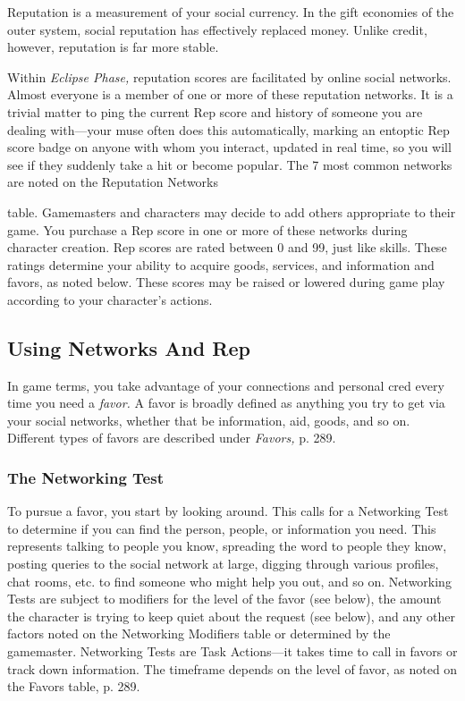 Reputation is a measurement of your social currency. In the gift economies of the outer system, social reputation has effectively replaced money. Unlike credit, however, reputation is far more stable. 

Within \textit{Eclipse Phase,} reputation scores are facilitated by online social networks. Almost everyone is a member of one or more of these reputation networks. It is a trivial matter to ping the current Rep score and history of someone you are dealing with—your muse often does this automatically, marking an entoptic Rep score badge on anyone with whom you interact, updated in real time, so you will see if they suddenly take a hit or become popular. The 7 most common networks are noted on the Reputation Networks 

table. Gamemasters and characters may decide to add others appropriate to their game. You purchase a Rep score in one or more of these networks during character creation. Rep scores are rated between 0 and 99, just like skills. These ratings determine your ability to acquire goods, services, and information and favors, as noted below. These scores may be raised or lowered during game play according to your character's actions. 

\subsection{Using Networks And Rep} 

In game terms, you take advantage of your connections and personal cred every time you need a \textit{favor.} A favor is broadly defined as anything you try to get via your social networks, whether that be information, aid, goods, and so on. Different types of favors are described under \textit{Favors,} p. 289. 

\subsubsection{The Networking Test} 

To pursue a favor, you start by looking around. This calls for a Networking Test to determine if you can find the person, people, or information you need. This represents talking to people you know, spreading the word to people they know, posting queries to the social network at large, digging through various profiles, chat rooms, etc. to find someone who might help you out, and so on. Networking Tests are subject to modifiers for the level of the favor (see below), the amount the character is trying to keep quiet about the request (see below), and any other factors noted on the Networking Modifiers table or determined by the gamemaster. Networking Tests are Task Actions—it takes time to call in favors or track down information. The timeframe depends on the level of favor, as noted on the Favors table, p. 289. 



